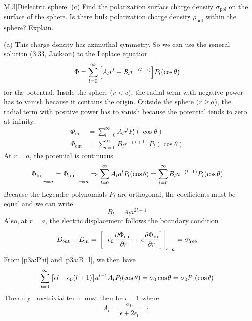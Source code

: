 \documentclass[12pt]{article}
\begin{document}
\begin{problem}{M.3}[Dielectric sphere]
(c) Find the polarization surface charge density $\sigma_{\text{pol}}$ on the
surface of the sphere. Is there bulk polarization charge density
$\rho_{\text{pol}}$ within the sphere? Explain.
\begin{solution}
(a) This charge density has azimuthal symmetry. So we can use the general
solution (3.33, Jackson) to the Laplace equation
\begin{equation}
    \Phi=\sum_{l=0}^\infty\qty[A_lr^l+B_lr^{-(l+1)}]P_l(\cos\theta)
\end{equation}
for the potential. Inside the sphere ($r<a$), the radial term with negative
power has to vanish because it contains the origin. Outside the sphere $(r\geq
a$), the radial term with positive power has to vanish because the potential
tends to zero at infinity.
\begin{subequations}\label{p3a:Phi}
    \begin{align}
        \Phi_{\text{in}}&=\sum_{l=0}^\infty A_lr^lP_l(\cos\theta)\\
        \Phi_{\text{out}}&=\sum_{l=0}^\infty B_lr^{-(l+1)}P_l(\cos\theta)
    \end{align} 
\end{subequations}
At $r=a$, the potential is continuous
\begin{equation}
    \eval{\Phi_{\text{in}}}_{r=a}
    =\eval{\Phi_{\text{out}}}_{r=a}\Rightarrow
    \sum_{l=0}^\infty A_la^lP_l(\cos\theta)=\sum_{l=0}^\infty
    B_la^{-(l+1)}P_l(\cos\theta)
\end{equation}
Because the Legendre polynomials $P_l$ are orthogonal, the coefficients must be
equal and we can write
\begin{equation}\label{p3a:B_l}
    B_l=A_la^{2l+1} 
\end{equation}
Also, at $r=a$, the electric displacement follows the boundary condition
\begin{equation}
    D_{\text{out}}-D_{\text{in}}=\eval{\qty[-\epsilon_0\frac{\partial\Phi_{\text{out}}}{\partial
    r}+\epsilon\frac{\partial\Phi_{\text{in}}}{\partial
    r}]}_{r=a}=\sigma_{\text{free}} 
\end{equation}
From \eqref{p3a:Phi} and \eqref{p3a:B_l}, we then have
\begin{equation}
    \sum_{l=0}^\infty\qty[\epsilon l+\epsilon_0(l+1)]a^{l-1}A_lP_l(\cos\theta)
    =\sigma_0\cos\theta=\sigma_0P_1(\cos\theta)
\end{equation}
The only non-trivial term must then be $l=1$ where
\begin{equation}
    A_l=\frac{\sigma_0}{\epsilon+2\epsilon_0}\Rightarrow

\end{equation}
\end{solution}
\end{problem}
\end{document}
